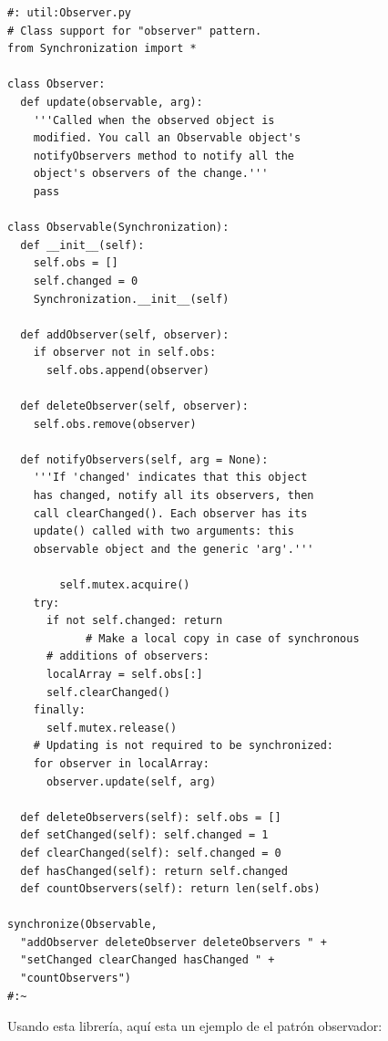 \documentclass{article}
\begin{document}
\begin{lstlisting} 
#: util:Observer.py 
# Class support for "observer" pattern. 
from Synchronization import * 

class Observer: 
  def update(observable, arg): 
    '''Called when the observed object is  
    modified. You call an Observable object's  
    notifyObservers method to notify all the  
    object's observers of the change.''' 
    pass 
    
class Observable(Synchronization): 
  def __init__(self): 
    self.obs = [] 
    self.changed = 0 
    Synchronization.__init__(self) 
    
  def addObserver(self, observer): 
    if observer not in self.obs: 
      self.obs.append(observer) 
      
  def deleteObserver(self, observer): 
    self.obs.remove(observer) 
    
  def notifyObservers(self, arg = None): 
    '''If 'changed' indicates that this object  
    has changed, notify all its observers, then  
    call clearChanged(). Each observer has its  
    update() called with two arguments: this  
    observable object and the generic 'arg'.''' 
    
        self.mutex.acquire() 
    try: 
      if not self.changed: return
            # Make a local copy in case of synchronous 
      # additions of observers: 
      localArray = self.obs[:] 
      self.clearChanged() 
    finally: 
      self.mutex.release() 
    # Updating is not required to be synchronized: 
    for observer in localArray: 
      observer.update(self, arg) 
      
  def deleteObservers(self): self.obs = [] 
  def setChanged(self): self.changed = 1 
  def clearChanged(self): self.changed = 0 
  def hasChanged(self): return self.changed 
  def countObservers(self): return len(self.obs) 
  
synchronize(Observable,  
  "addObserver deleteObserver deleteObservers " + 
  "setChanged clearChanged hasChanged " + 
  "countObservers") 
#:~ 
\end{lstlisting}

Usando esta librería, aquí esta un ejemplo de el patrón  observador:\newline
\end{document}
